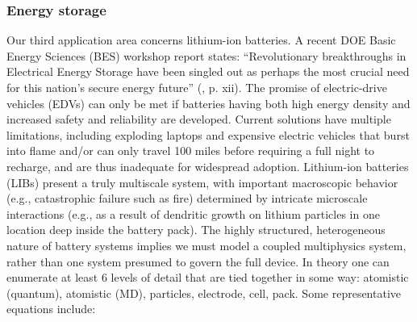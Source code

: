 \documentclass[11pt]{article}
\newcommand{\MarginPar}[1]{\marginpar{%
\vskip-\baselineskip %
\raggedright\tiny\sffamily
\hrule\smallskip{\color{red}#1}\par\smallskip\hrule}}
\begin{document}

\subsubsection*{Energy storage}
Our third application area concerns lithium-ion batteries.
A recent DOE Basic Energy Sciences (BES) workshop report states: 
``Revolutionary breakthroughs in Electrical Energy Storage have been singled out as perhaps the most crucial need
for this nation's secure energy future''  (\cite{ees_rpt}, p. xii).
The promise of electric-drive vehicles (EDVs) can only be met if batteries having both high energy density and increased safety 
and reliability are developed.  Current solutions have multiple limitations, including exploding laptops and expensive electric vehicles that burst into 
flame and/or can only travel 100 miles before requiring a full night to recharge, and are thus inadequate for widespread adoption.  
Lithium-ion batteries (LIBs) present a truly multiscale system, with important macroscopic behavior
(e.g., catastrophic failure such as fire) determined by intricate microscale
interactions (e.g., as a result of dendritic growth on lithium particles in
one location deep inside the battery pack). 
The highly structured, heterogeneous nature of battery systems implies we must model a coupled multiphysics system, rather
than one system presumed to govern the full device.   
In theory one can enumerate at least 6 levels of detail that are tied together in some way: 
atomistic (quantum), atomistic (MD), particles, electrode, cell, pack.   Some
representative equations include:\\
\end{document}
